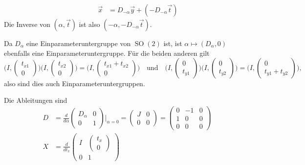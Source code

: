 \begin{loesung}
\begin{teilaufgaben}
\begin{align*}
&&&& \vec{x} &= D_{-\alpha}\vec{y} + (-D_{-\alpha}\vec{t})
\end{align*}
Die Inverse von $(\alpha,\vec{t})$ ist also $(-\alpha,-D_{-\alpha}\vec{t})$.
\item
Da $D_\alpha$ eine Einparameteruntergruppe von $\operatorname{SO}(2)$ ist,
ist $\alpha\mapsto (D_\alpha,0)$ ebenfalls eine Einparameteruntergruppe.
Für die beiden anderen gilt
\[
\biggl(I,\begin{pmatrix}t_{x1}\\0\end{pmatrix}\biggr)
\biggl(I,\begin{pmatrix}t_{x2}\\0\end{pmatrix}\biggr)
=
\biggl(I,\begin{pmatrix}t_{x1}+t_{x2}\\0\end{pmatrix}\biggr)
\quad\text{und}\quad
\biggl(I,\begin{pmatrix}0\\t_{y1}\end{pmatrix}\biggr)
\biggl(I,\begin{pmatrix}0\\t_{y2}\end{pmatrix}\biggr)
=
\biggl(I,\begin{pmatrix}0\\t_{y1}+t_{y2}\end{pmatrix}\biggr),
\]
also sind dies auch Einparameteruntergruppen.
\item
Die Ableitungen sind
\begin{align*}
D
&=
\frac{d}{d\alpha}\begin{pmatrix}D_\alpha&0\\0&1\end{pmatrix}\bigg|_{\alpha=0}
=
\begin{pmatrix}J&0\\0&0\end{pmatrix}
=
\begin{pmatrix}
0&-1&0\\
1& 0&0\\
0& 0&0
\end{pmatrix}
\\
X
&=
\frac{d}{dt_x}
\left.
\begin{pmatrix}I&\begin{pmatrix}t_x\\0\end{pmatrix}\\0&1\end{pmatrix}

\end{align*}
\end{teilaufgaben}
\end{loesung}
